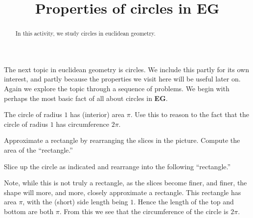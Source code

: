 \documentclass{ximera}
\title{Properties of circles in \textbf{EG}}
\begin{document}
\begin{abstract}
In this activity, we study circles in euclidean geometry.
\end{abstract}
\maketitle


The next topic in euclidean geometry is circles. We include this
partly for its own interest, and partly because the properties we
visit here will be useful later on. Again we explore the topic through
a sequence of problems. We begin with perhaps the most basic fact of
all about circles in \textbf{EG}.

\begin{problem}
The circle of radius $1$ has (interior) area $\pi$. Use this to reason
to the fact that the circle of radius $1$ has circumference $2\pi$.%
\begin{image}
\end{image}

\begin{hint}
Approximate a rectangle by rearranging the slices in the picture.
Compute the area of the ``rectangle.''
\end{hint}
\begin{freeResponse}
Slice up the circle as indicated and rearrange into the following
``rectangle.'' 
\begin{image}
\end{image}
Note, while this is not truly a rectangle, as the slices become finer,
and finer, the shape will more, and more, closely approximate a
rectangle. This rectangle has area $\pi$, with the (short) side length
being $1$. Hence the length of the top and bottom are both $\pi$. From
this we see that the circumference of the circle is $2\pi$.
\end{freeResponse}
\end{problem}
\end{document}
